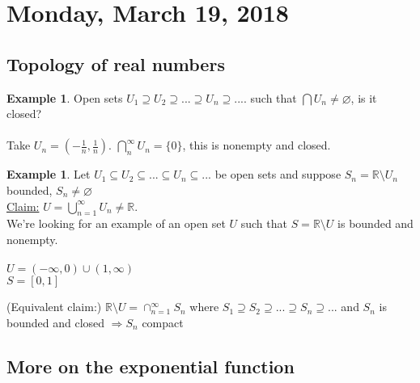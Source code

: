 \documentclass[12pt]{article}
\theoremstyle{plain}
\theoremstyle{definition}
\newtheorem{example}[theorem]{Example}
\begin{document}
\newpage

\section{Monday, March 19, 2018}

\subsection{Topology of real numbers}

\begin{example}
	Open sets $U_1 \supseteq U_2 \supseteq ... \supseteq U_n \supseteq ....$ such that $\bigcap U_n \neq \varnothing$, is it closed?\\
	\\
	Take $U_n = (-\frac{1}{n}, \frac{1}{n})$. $\bigcap^\infty_{n} U_n = \{ 0 \}$, this is nonempty and closed.\\
\end{example}

\begin{example}
	Let $U_1 \subseteq U_2 \subseteq ... \subseteq U_n \subseteq ...$ be open sets and suppose $S_n = \mathbb{R}\setminus U_n$ bounded, $S_n \neq \varnothing$\\
	\underline{Claim:} $U = \bigcup^\infty_{n=1} U_n \neq \mathbb{R}$.\\
	We're looking for an example of an open set $U$ such that $S=\mathbb{R} \setminus U$ is bounded and nonempty.\\
	\\
	$U = (-\infty, 0) \cup (1, \infty)$\\
	$S = [0,1]$
\end{example}

(Equivalent claim:) $\mathbb{R} \setminus U = \cap^\infty_{n=1} S_n$ where $S_1 \supseteq S_2 \supseteq ... \supseteq S_n \supseteq ...$ and $S_n$ is bounded and closed $\Longrightarrow S_n$ compact

\subsection{More on the exponential function}
\end{document}

